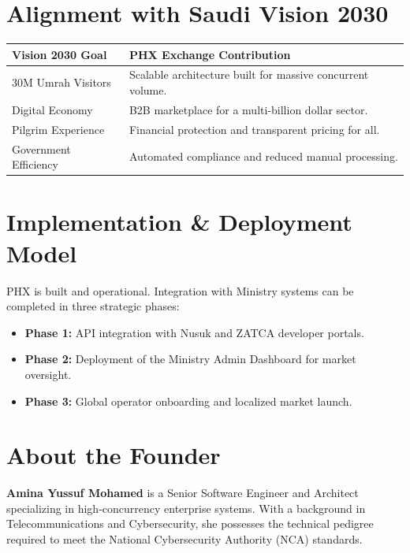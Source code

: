\documentclass[11pt,a4paper]{article}
\begin{document}
\section{Alignment with Saudi Vision 2030}

\begin{center}
\begin{tabular}{|p{4cm}|p{10cm}|}
\hline
\textbf{Vision 2030 Goal} & \textbf{PHX Exchange Contribution} \\
\hline
30M Umrah Visitors & Scalable architecture built for massive concurrent volume. \\
\hline
Digital Economy & B2B marketplace for a multi-billion dollar sector. \\
\hline
Pilgrim Experience & Financial protection and transparent pricing for all. \\
\hline
Government Efficiency & Automated compliance and reduced manual processing. \\
\hline
\end{tabular}
\end{center}

\section{Implementation \& Deployment Model}

PHX is built and operational. Integration with Ministry systems can be completed in three strategic phases:

\begin{itemize}
  \item \textbf{Phase 1:} API integration with Nusuk and ZATCA developer portals.
  \item \textbf{Phase 2:} Deployment of the Ministry Admin Dashboard for market oversight.
  \item \textbf{Phase 3:} Global operator onboarding and localized market launch.
\end{itemize}

\section{About the Founder}

\textbf{Amina Yussuf Mohamed} is a Senior Software Engineer and Architect specializing in high-concurrency enterprise systems. With a background in Telecommunications and Cybersecurity, she possesses the technical pedigree required to meet the National Cybersecurity Authority (NCA) standards.
\end{document}
